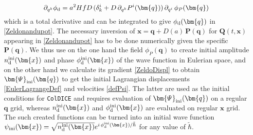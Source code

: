 \documentclass[twocolumn, nofootinbib, showpacs, superscriptaddress]{revtex4-1}
\newcommand{\thbar}{\tilde\hbar}
\renewcommand{\d}[0]{{\rm{d}}}
\renewcommand{\v}[1]{\bm{#1} }
\newcommand{\vx}[0]{\bm{x} }
\newcommand{\vq}[0]{\bm{q} }
\begin{document}
\begin{equation}
\partial_{q^k} \phi_\d =   a^2 H f D\,(\delta_k^i + D\,\partial_{q^k} P^i(\vq) )\, \partial_{q^i}\, \phi_P(\vq) 
\end{equation}
which is  a total derivative and can be integrated to give $\phi_\d(\vq)$ in \eqref{Zeldonandupot}.
The necessary inversion of $\v{x} = \vq +  D(a)\,\v{P}(\vq)$ for $ \v{Q}(t,\vx) $ appearing in \eqref{Zeldonandupot} has to be done numerically given the specific $\v{P}(\vq)$.
We thus use on the one hand the field $\phi_{P}(\v{q})$ to create initial amplitude $n^{\rm ini}_\d(\v{x})$ and phase $\phi_\d^{\rm ini}(\v{x})$ of the wave function in Eulerian space, and on the other hand we calculate its gradient \eqref{ZeldoDispl} to obtain $\v{\varPsi}_{\rm ini}(\v{q})$ to get the initial Lagrangian displacements \eqref{EulerLagrangeDef} and velocities \eqref{defPsi}.
The latter are used as the initial conditions for \texttt{ColDICE} 
and requires evaluation of $\v{\varPsi}_{\rm ini}(\v{q})$ on a regular $\v{q}$ grid, whereas $n^{\rm ini}_\d(\v{x})$ and $\phi_\d^{\rm ini}(\v{x})$ are evaluated on  regular $\v{x}$ grid. The such created functions can be turned into an initial wave function $\psi_{\rm ini}(\v{x})= \sqrt{n^{\rm ini}_\d(\v{x})} e^{i \,\phi_\d^{\rm ini}(\v{x})/ \thbar}$ for any value of $\thbar$.
\end{document}
